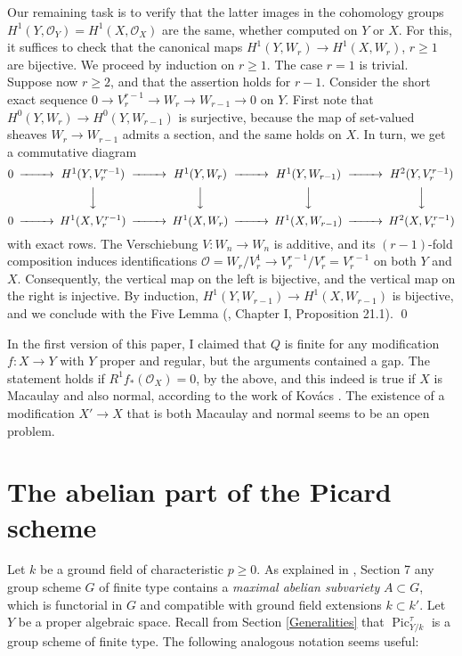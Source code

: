 \documentclass[oneside, 12pt]{amsart}
\newcommand\mylabel[1]{\label{#1}\marginpar{\vspace{-1ex}\medskip\medskip\footnotesize \tt #1}}
\renewcommand\mylabel[1]{\label{#1}}
\theoremstyle{definition}
\theoremstyle{remark}
\renewcommand{\O}{\mathscr{O}}
\newcommand{\Pic}{\operatorname{Pic}}
\newcommand{\ra}{\rightarrow}
\begin{document}
Our remaining task is to verify that the latter images 
 in the cohomology groups  $H^1(Y,\O_Y)=H^1(X,\O_X)$ are the same, whether
computed on $Y$ or $X$. For this, it suffices to check that the canonical maps
$H^1(Y,W_r)\ra H^1(X,W_r)$, $r\geq 1$ are bijective. We proceed by induction on $r\geq 1$.
The case $r=1$ is trivial. Suppose now $r\geq 2$, and that the assertion holds for $r-1$.
Consider the short exact sequence $0\ra V^{r-1}_r\ra W_r\ra W_{r-1}\ra 0$ on $Y$.
First note that $H^0(Y,W_r)\ra H^0(Y,W_{r-1})$ is surjective, because the map of set-valued sheaves
$W_r\ra W_{r-1}$ admits a section, and the same holds on $X$. In turn, we get a commutative diagram
$$
\begin{CD}
0	@>>>	H^1(Y,V_r^{r-1})	@>>>	H^1(Y,W_r)	@>>> 	H^1(Y,W_{r-1})	@>>>	H^2(Y,V_r^{r-1})\\
@.		@VVV			@VVV		@VVV			@VVV\\
0	@>>>	H^1(X,V_r^{r-1})	@>>>	H^1(X,W_r)	@>>> 	H^1(X,W_{r-1})	@>>>	H^2(X,V_r^{r-1})
\end{CD}
$$
with exact rows. 
The Verschiebung $V:W_n\ra W_n$ is additive, and its $(r-1)$-fold composition induces identifications
$\O=W_r/V_r^1\ra V_r^{r-1}/V_r^r=V_r^{r-1}$ on both $Y$ and $X$. Consequently,
the vertical map on the left is bijective, and the vertical map on the right is injective.
By induction, $H^1(Y,W_{r-1})\ra H^1(X,W_{r-1})$ is bijective, and we conclude with the Five Lemma (\cite{Mitchell 1965}, Chapter I, Proposition 21.1).
\qed

\medskip
In the first version of this paper, I claimed that $Q$ is finite   for any modification  $f:X\ra Y$ with $Y$ proper and regular, but
the arguments contained a gap. The statement holds if $R^1f_*(\O_X)=0$, by the above,
and this indeed is true if $X$ is  Macaulay and  also normal, according to the work of Kov\'acs \cite{Kovacs 2017}.
The existence of a modification $X'\ra X$ that is both Macaulay and normal seems to be an open problem.



\section{The abelian part of the Picard scheme}
\mylabel{Abelian part}

Let $k$ be a ground field of characteristic $p\geq 0$.
As explained in \cite{Laurent; Schroeer 2021}, Section 7
any group scheme $G$ of finite type contains a \emph{maximal abelian subvariety} $A\subset G$, which is functorial in $G$ and compatible with ground
field extensions $k\subset k'$.
Let  $Y$  be a proper algebraic space. Recall from Section \ref{Generalities} that  $\Pic^\tau_{Y/k}$ is a group scheme of finite type.
The following analogous notation seems   useful:
\end{document}
